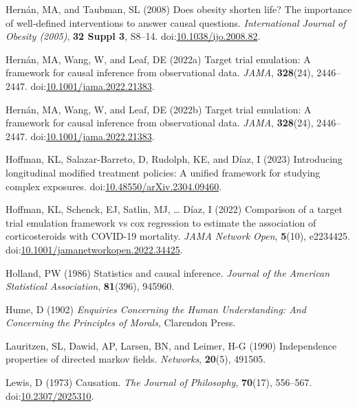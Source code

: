 \documentclass[
  singlecolumn,
  9pt]{article}
\begin{document}
\begin{CSLReferences}
Hernán, MA, and Taubman, SL (2008) Does obesity shorten life? The
importance of well-defined interventions to answer causal questions.
\emph{International Journal of Obesity (2005)}, \textbf{32 Suppl 3},
S8--14.
doi:\href{https://doi.org/10.1038/ijo.2008.82}{10.1038/ijo.2008.82}.

Hernán, MA, Wang, W, and Leaf, DE (2022a) Target trial emulation: A
framework for causal inference from observational data. \emph{JAMA},
\textbf{328}(24), 2446--2447.
doi:\href{https://doi.org/10.1001/jama.2022.21383}{10.1001/jama.2022.21383}.

Hernán, MA, Wang, W, and Leaf, DE (2022b) Target trial emulation: A
framework for causal inference from observational data. \emph{JAMA},
\textbf{328}(24), 2446--2447.
doi:\href{https://doi.org/10.1001/jama.2022.21383}{10.1001/jama.2022.21383}.

Hoffman, KL, Salazar-Barreto, D, Rudolph, KE, and Díaz, I (2023)
Introducing longitudinal modified treatment policies: A unified
framework for studying complex exposures.
doi:\href{https://doi.org/10.48550/arXiv.2304.09460}{10.48550/arXiv.2304.09460}.

Hoffman, KL, Schenck, EJ, Satlin, MJ, \ldots{} Díaz, I (2022) Comparison
of a target trial emulation framework vs cox regression to estimate the
association of corticosteroids with COVID-19 mortality. \emph{JAMA
Network Open}, \textbf{5}(10), e2234425.
doi:\href{https://doi.org/10.1001/jamanetworkopen.2022.34425}{10.1001/jamanetworkopen.2022.34425}.

Holland, PW (1986) Statistics and causal inference. \emph{Journal of the
American Statistical Association}, \textbf{81}(396), 945960.

Hume, D (1902) \emph{Enquiries Concerning the Human Understanding: And
Concerning the Principles of Morals}, Clarendon Press.

Lauritzen, SL, Dawid, AP, Larsen, BN, and Leimer, H-G (1990)
Independence properties of directed markov fields. \emph{Networks},
\textbf{20}(5), 491505.

Lewis, D (1973) Causation. \emph{The Journal of Philosophy},
\textbf{70}(17), 556--567.
doi:\href{https://doi.org/10.2307/2025310}{10.2307/2025310}.


\end{CSLReferences}
\end{document}
